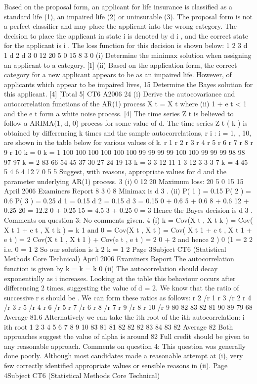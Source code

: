 
Based on the proposal form, an applicant for life insurance is classified as a standard
life (1), an impaired life (2) or uninsurable (3). The proposal form is not a perfect
classifier and may place the applicant into the wrong category.
The decision to place the applicant in state i is denoted by d i , and the correct state for
the applicant is i .
The loss function for this decision is shown below:
1
2
3
d 1 d 2 d 3
0
12
20 5
0
15 8
3
0
(i) Determine the minimax solution when assigning an applicant to a category. [1]
(ii) Based on the application form, the correct category for a new applicant
appears to be as an impaired life. However, of applicants which appear to be
impaired lives, 15%
Determine the Bayes solution for this applicant.
[4]
[Total 5]
CT6 A2006 24
(i)
Derive the autocovariance and autocorrelation functions of the AR(1) process
X t = X t
where
(ii)
1
+ e t
< 1 and the e t form a white noise process.
[4]
The time series Z t is believed to follow a ARIMA(1, d, 0) process for some
value of d. The time series Z t ( k ) is obtained by differencing k times and the
sample autocorrelations, {r i : i = 1, , 10}, are shown in the table below for
various values of k.
r 1
r 2
r 3
r 4
r 5
r 6
r 7
r 8
r 9
r 10
k = 0 k = 1
100%
100%
100%
100%
100%
100%
99%
99%
99%
99%
100%
100%
99%
99%
99%
98%
98%
97%
97%
k = 2
83%
66%
54%
45%
37%
30%
27%
24%
19%
13%
k = 3
3%
12%
11%
1%
3%
12%
3%
3%
3%
7%
k = 4
45%
5%
4%
6%
4%
12%
7%
0%
5%
5%
Suggest, with reasons, appropriate values for d and the parameter
underlying AR(1) process.
3
(i)
0
12
20
Maximum loss: 20
5
0
15
15
April 2006
Examiners Report
8
3
0
8
Minimax is d 3 .
(ii)
P( 1 ) = 0.15
P( 2 ) = 0.6
P( 3 ) = 0.25
d 1 = 0.15
d 2 = 0.15
d 3 = 0.15
0 + 0.6
5 + 0.6
8 + 0.6
12 + 0.25 20 = 12.2
0 + 0.25 15 = 4.5
3 + 0.25 0 = 3
Hence the Bayes decision is d 3 .
Comments on question 3: No comments given.
4
(i)
k
= Cov(X t , X t k )
= Cov( X t 1 + e t , X t k )
= k 1
and
0
= Cov(X t , X t )
= Cov( X t 1 + e t , X t 1 + e t )
= 2 Cov(X t 1 , X t 1 ) + Cov(e t , e t )
= 2 0 + 2
and hence
2 )
0 (1
=
2
2
i.e.
0 =
1
2
So our solution is
k 2
k =
1
2
Page 3Subject CT6 (Statistical Methods Core Technical)
April 2006
Examiners Report
The autocorrelation function is given by
k
=
k
=
k
0
(ii)
The autocorrelation should decay exponentially as i increases. Looking at the
table this behaviour occurs after differencing 2 times, suggesting the value of
d = 2.
We know that the ratio of successive r s should be . We can form these
ratios as follows:
r 2 /r 1
r 3 /r 2
r 4 /r 3
r 5 /r 4
r 6 /r 5
r 7 /r 6
r 8 /r 7
r 9 /r 8
r 10 /r 9 80%
82%
83%
82%
81%
90%
89%
79%
68%
Average 81.6%
Alternatively we can take the ith root of the ith autocorrelation:
i ith root
1
2
3
4
5
6
7
8
9
10 83%
81%
81%
82%
82%
82%
83%
84%
83%
82%
Average 82%
Both approaches suggest the value of alpha is around 82%
Full credit should be given to any reasonable approach.
Comments on question 4: This question was generally done poorly. Although most
candidates made a reasonable attempt at (i), very few correctly identified appropriate values
or sensible reasons in (ii).
Page 4Subject CT6 (Statistical Methods Core Technical)

